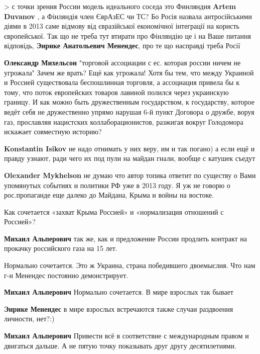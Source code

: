 \begin{itemize}
\begin{itemize}
> с точки зрения России модель идеального соседа это Финляндия
\textbf{Artem Duvanov} , а Фінляндія член ЄврАзЕС чи ТС? Бо Росія назвала антросійськими діями в 2013 саме відмову від євразійської економічної інтеграції на користь європейської. Так що не треба тут втирати про Фінляндію
це і на Ваше питання відповідь, \textbf{Энрике Анатольевич Менендес}, про те що насправді треба Росії

\textbf{Олександр Михельсон} "торговой ассоциации с ес. которая россии ничем не угрожала" Зачем же врать?
Ещё как угрожала! Хотя бы тем, что между Украиной и Россией существовала беспошлинная торговля, а ассоциация привела бы к тому, что поток европейских товаров лавиной полился через украинскую границу.
И как можно быть дружественным государством, к государству, которое ведёт себя не дружественно упрямо нарушая 6-й пункт Договора о дружбе, воруя газ, прославляя нацистских коллаборационистов, разжигая вокруг Голодомора искажает совместную историю?

\textbf{Konstantin Isikov} не надо отнимать у них веру, им и так погано) а если ещё и правду узнают, ради чего их под пули на майдан гнали, вообще с катушек съедут

\textbf{Olexander Mykhelson} не думаю что автор топика ответит по существу о Вами упомянутых событиях и политики РФ уже в 2013 году. Я уж не говорю о рос.пропаганде еще далеко до Майдана, Крыма и войны на востоке.

\end{itemize} %

Как сочетается «захват Крыма Россией» и «нормализация отношений с Россией»?

\begin{itemize} %
\textbf{Михаил Альперович} так же, как и предложение России продлить контракт на прокачку российского газа на 15 лет.

Нормально сочетается. Это ж Украина, страна победившего двоемыслия. Что нам г-н Менендес постоянно демонстрирует.

\textbf{Михаил Альперович} Нормально сочетается. В мире взрослых так бывает

\textbf{Энрике Менендес} в мире взрослых встречаются также случаи раздвоения личности, нет?:)

\textbf{Михаил Альперович} Привести всё в соответствие с международным правом и двигаться дальше. А не пятую точку показывать друг другу десятилетиями.


\end{itemize}
\end{itemize}
